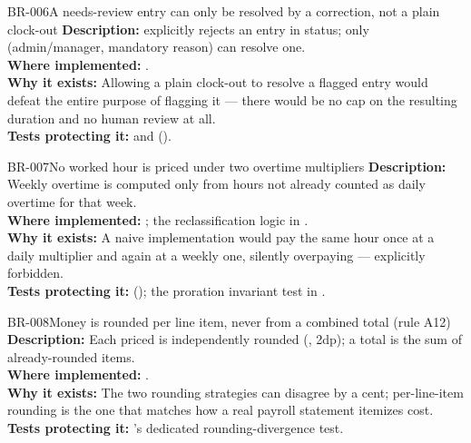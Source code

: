 \begin{businessrule}{BR-006}{A needs-review entry can only be resolved by a correction, not a plain clock-out}
\textbf{Description:}  explicitly rejects an entry in
 status; only  (admin/manager,
mandatory reason) can resolve one.\\
\textbf{Where implemented:} .\\
\textbf{Why it exists:} Allowing a plain clock-out to resolve a flagged
entry would defeat the entire purpose of flagging it --- there would be
no cap on the resulting duration and no human review at all.\\
\textbf{Tests protecting it:}
and
().
\end{businessrule}

\begin{businessrule}{BR-007}{No worked hour is priced under two overtime multipliers}
\textbf{Description:} Weekly overtime is computed only from hours not
already counted as daily overtime for that week.\\
\textbf{Where implemented:} ;
the reclassification logic in .\\
\textbf{Why it exists:} A naive implementation would pay the same hour
once at a daily multiplier and again at a weekly one, silently
overpaying --- explicitly forbidden.\\
\textbf{Tests protecting it:} 
(); the proration invariant test in
.
\end{businessrule}

\begin{businessrule}{BR-008}{Money is rounded per line item, never from a combined total (rule A12)}
\textbf{Description:} Each priced  is independently
rounded (, 2dp); a total is the sum of already-rounded
items.\\
\textbf{Where implemented:} .\\
\textbf{Why it exists:} The two rounding strategies can disagree by a
cent; per-line-item rounding is the one that matches how a real payroll
statement itemizes cost.\\
\textbf{Tests protecting it:} 's
dedicated rounding-divergence test.
\end{businessrule}


